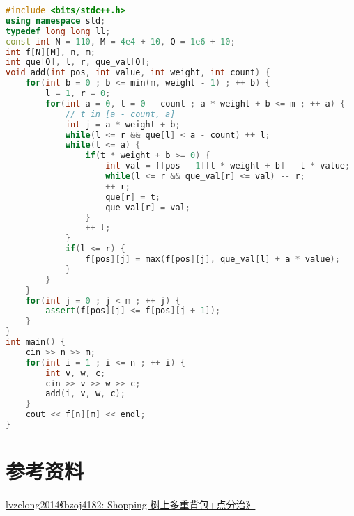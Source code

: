 \documentclass[UTF8]{article}
\begin{document}
\begin{lstlisting}[language=C++,numberstyle=\tiny,basicstyle=\ttfamily]
#include <bits/stdc++.h>
using namespace std;
typedef long long ll;
const int N = 110, M = 4e4 + 10, Q = 1e6 + 10;
int f[N][M], n, m;
int que[Q], l, r, que_val[Q];
void add(int pos, int value, int weight, int count) {
    for(int b = 0 ; b <= min(m, weight - 1) ; ++ b) {
        l = 1, r = 0;
        for(int a = 0, t = 0 - count ; a * weight + b <= m ; ++ a) {
            // t in [a - count, a]
            int j = a * weight + b;
            while(l <= r && que[l] < a - count) ++ l;
            while(t <= a) {
                if(t * weight + b >= 0) {
                    int val = f[pos - 1][t * weight + b] - t * value;
                    while(l <= r && que_val[r] <= val) -- r;
                    ++ r;
                    que[r] = t;
                    que_val[r] = val;
                }
                ++ t;
            }
            if(l <= r) {
                f[pos][j] = max(f[pos][j], que_val[l] + a * value);
            }
        }
    }
    for(int j = 0 ; j < m ; ++ j) {
        assert(f[pos][j] <= f[pos][j + 1]);
    }
}
int main() {
    cin >> n >> m;
    for(int i = 1 ; i <= n ; ++ i) {
        int v, w, c;
        cin >> v >> w >> c;
        add(i, v, w, c);
    }
    cout << f[n][m] << endl;
}    
\end{lstlisting}

\section{参考资料}

\href{https://blog.csdn.net/lvzelong2014/article/details/79594011}{lvzelong2014《bzoj4182: Shopping 树上多重背包+点分治》}
\end{document}
